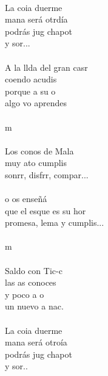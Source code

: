 \documentclass[12pt]{article}
\begin{document}
\sffamily

\begin{multicols*}{2}
\begin{cancion}%
	 \\
	La coia duerme \\
	mana será otrdía\\
	podrás jug chapot \\
	y sor... \\
\jump\\
	A la llda del gran casr\\
	coendo acudis \\
	porque a su o\\
	algo vo aprendes \\
\jump\\
	 m \\
\jump\\
	Los conos de Mala\\
	muy ato cumplis \\
	sonrr, disfrr, compar...\\
\jump\\
	o os enseñá\\
	que el esque es su hor\\
	promesa, lema y  cumplis... \\
\jump\\
	 m \\
\jump\\
	Saldo con Tic-c\\
	las as conoces  \\
	y poco a o\\
	un nuevo a nac. \\
\jump\\
\huecotitulo
	La coia duerme \\
	mana será otroía\\
	podrás jug chapot\\
	y sor..   \\
\end{cancion}%
\end{multicols*}
\end{document}
